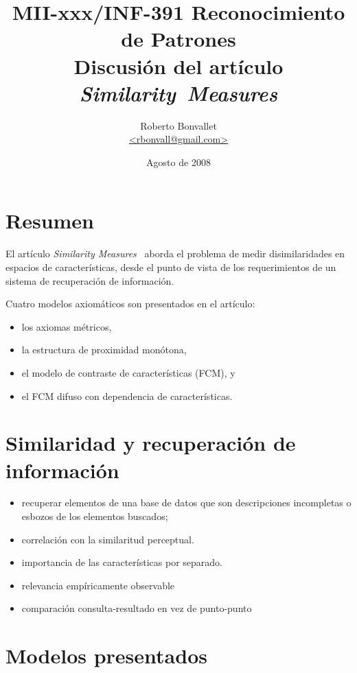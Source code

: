 \documentclass[spanish]{article}
\title{MII-xxx/INF-391 Reconocimiento de Patrones \\
    Discusión del artículo \textit{Similarity~Measures}}
\author{Roberto Bonvallet \\ \url {<rbonvall@gmail.com>}}
\date{Agosto de 2008}
\begin{document}
\maketitle

\section{Resumen}
El artículo \textit{Similarity Measures}~\cite{sim} aborda el problema de medir
disimilaridades en espacios de características, desde el punto de vista de los
requerimientos de un sistema de recuperación de información.


Cuatro modelos axiomáticos son presentados en el artículo:
\begin{itemize}
    \item los axiomas métricos,
    \item la estructura de proximidad monótona,
    \item el modelo de contraste de características (FCM), y
    \item el FCM difuso con dependencia de características.
\end{itemize}


\section{Similaridad y recuperación de información}

\begin{itemize}
    \item recuperar elementos de una base de datos que son descripciones incompletas o esbozos de los
        elementos buscados;
    \item correlación con la similaritud perceptual.
    \item importancia de las características por separado.
    \item relevancia empíricamente observable
    \item comparación consulta-resultado en vez de punto-punto
\end{itemize}



\section{Modelos presentados}
\end{document}
